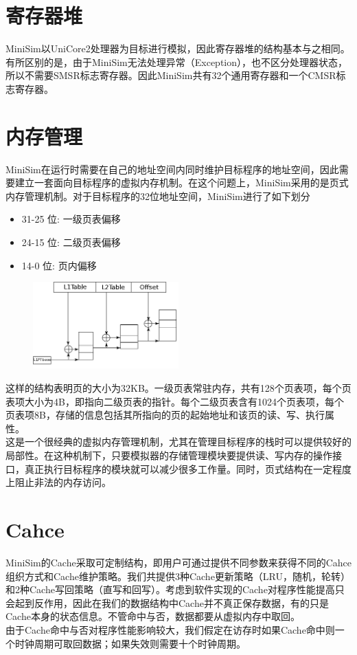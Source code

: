 \documentclass[12pt,a4paper,Flow]{report}
\begin{document}
\section{寄存器堆}
MiniSim以UniCore2处理器为目标进行模拟，因此寄存器堆的结构基本与之相同。有所区别的是，由于MiniSim无法处理异常（Exception），也不区分处理器状态，所以不需要SMSR标志寄存器。因此MiniSim共有32个通用寄存器和一个CMSR标志寄存器。
\section{内存管理}
MiniSim在运行时需要在自己的地址空间内同时维护目标程序的地址空间，因此需要建立一套面向目标程序的虚拟内存机制。在这个问题上，MiniSim采用的是页式内存管理机制。对于目标程序的32位地址空间，MiniSim进行了如下划分
\begin{itemize}
\item 31-25 位: 一级页表偏移
\item 24-15 位: 二级页表偏移
\item 14-0 位: 页内偏移
\end{itemize}
\begin{figure}[H]
  \centering
  \includegraphics[width=0.5\textwidth]{pt.png}
\end{figure}
这样的结构表明页的大小为32KB。一级页表常驻内存，共有128个页表项，每个页表项大小为4B，即指向二级页表的指针。每个二级页表含有1024个页表项，每个页表项8B，存储的信息包括其所指向的页的起始地址和该页的读、写、执行属性。\\
\indent 这是一个很经典的虚拟内存管理机制，尤其在管理目标程序的栈时可以提供较好的局部性。在这种机制下，只要模拟器的存储管理模块要提供读、写内存的操作接口，真正执行目标程序的模块就可以减少很多工作量。同时，页式结构在一定程度上阻止非法的内存访问。
\section{Cahce}
MiniSim的Cache采取可定制结构，即用户可通过提供不同参数来获得不同的Cahce组织方式和Cache维护策略。我们共提供3种Cache更新策略（LRU，随机，轮转）和2种Cache写回策略（直写和回写）。考虑到软件实现的Cache对程序性能提高只会起到反作用，因此在我们的数据结构中Cache并不真正保存数据，有的只是Cache本身的状态信息。不管命中与否，数据都要从虚拟内存中取回。\\
\indent 由于Cache命中与否对程序性能影响较大，我们假定在访存时如果Cache命中则一个时钟周期可取回数据；如果失效则需要十个时钟周期。
\end{document}

